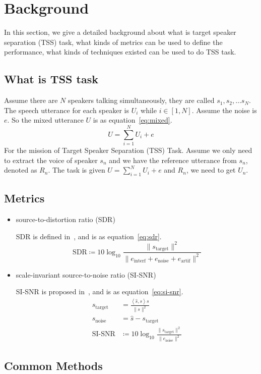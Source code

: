 

\section{Background}\label{sec:background}

In this section, we give a detailed background about what is target speaker separation (TSS) task, what kinds of metrics can be used to define the performance, what kinds of techniques existed can be used to do TSS task.

\subsection{What is TSS task}\label{subsec:what-is-tss-task}

Assume there are $N$ speakers talking simultaneously, they are called $s_1, s_2, \dots s_N$. The speech utterance for each speaker is $U_i$ while $i\in\left[ 1, N \right]$. Assume the noise is $e$.
So the mixed utterance $U$ is as equation~\ref{eq:mixed}.
\begin{equation}
    U = \sum\limits_{i=1}^N U_i + e\label{eq:mixed}
\end{equation}
For the mission of Target Speaker Separation (TSS) Task. Assume we only need to extract the voice of speaker $s_n$ and we have the reference utterance from $s_n$, denoted as $R_n$.
The task is given $U = \sum\limits_{i=1}^N U_i + e$ and $R_n$, we need to get $U_n$.

\subsection{Metrics}\label{subsec:metrics}
\begin{itemize}
    \item source-to-distortion ratio (SDR)

    SDR is defined in~\cite{performance_measurement}, and is as equation~\ref{eq:sdr}.
    \begin{equation}
        \text{SDR} \coloneqq 10\log_{10}\frac{\| s_{\text{target}} \|^2}{\| e_{\text{interf}} + e_{\text{noise}} + e_{\text{artif}} \|^2}
        \label{eq:sdr}
    \end{equation}

    \item scale-invariant source-to-noise ratio (SI-SNR)

    SI-SNR is proposed in~\cite{tasnet}, and is as equation~\ref{eq:si-snr}.
    \begin{equation}
        \begin{aligned}
            s_{\text{target}} &= \frac{\left< \hat{s}, s \right>s}{\| s \|^2} \\
            s_{\text{noise}} &= \hat{s} - s_{\text{target}} \\
            \text{SI-SNR} &\coloneqq 10\log_{10}\frac{\| s_{\text{target}} \|^2}{\| e_{\text{noise}} \|^2}
        \end{aligned}\label{eq:si-snr}
    \end{equation}
\end{itemize}

\subsection{Common Methods}\label{subsec:common-methods}
